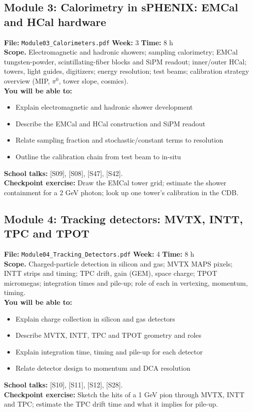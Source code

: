 \documentclass[11pt,letterpaper]{article}
\begin{document}
\subsection*{Module 3: Calorimetry in sPHENIX: EMCal and HCal hardware}
\textbf{File:} \texttt{Module03\_Calorimeters.pdf} \quad \textbf{Week:} 3 \quad \textbf{Time:} 8 h\\
\textbf{Scope.} Electromagnetic and hadronic showers; sampling calorimetry; EMCal tungsten-powder, scintillating-fiber blocks and SiPM readout; inner/outer HCal; towers, light guides, digitizers; energy resolution; test beams; calibration strategy overview (MIP, $\pi^0$, tower slope, cosmics).\\
\textbf{You will be able to:}
\begin{itemize}
\item Explain electromagnetic and hadronic shower development
\item Describe the EMCal and HCal construction and SiPM readout
\item Relate sampling fraction and stochastic/constant terms to resolution
\item Outline the calibration chain from test beam to in-situ
\end{itemize}
\textbf{School talks:} [S09], [S08], [S47], [S42].\\
\textbf{Checkpoint exercise:} Draw the EMCal tower grid; estimate the shower containment for a 2 GeV photon; look up one tower's calibration in the CDB.
\medskip
\subsection*{Module 4: Tracking detectors: MVTX, INTT, TPC and TPOT}
\textbf{File:} \texttt{Module04\_Tracking\_Detectors.pdf} \quad \textbf{Week:} 4 \quad \textbf{Time:} 8 h\\
\textbf{Scope.} Charged-particle detection in silicon and gas; MVTX MAPS pixels; INTT strips and timing; TPC drift, gain (GEM), space charge; TPOT micromegas; integration times and pile-up; role of each in vertexing, momentum, timing.\\
\textbf{You will be able to:}
\begin{itemize}
\item Explain charge collection in silicon and gas detectors
\item Describe MVTX, INTT, TPC and TPOT geometry and roles
\item Explain integration time, timing and pile-up for each detector
\item Relate detector design to momentum and DCA resolution
\end{itemize}
\textbf{School talks:} [S10], [S11], [S12], [S28].\\
\textbf{Checkpoint exercise:} Sketch the hits of a 1 GeV pion through MVTX, INTT and TPC; estimate the TPC drift time and what it implies for pile-up.
\medskip
\end{document}
